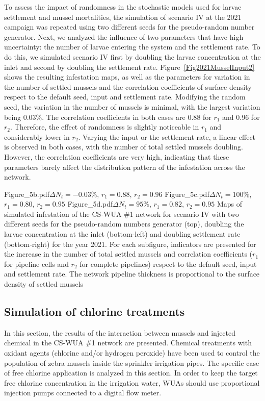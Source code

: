\documentclass[review,authoryear]{elsarticle}
\begin{document}
To assess the impact of randomness in the stochastic models used for larvae
settlement and mussel mortalities, the simulation of scenario IV at the 2021
campaign was repeated using two different seeds for the pseudo-random number
generator. Next, we analyzed the influence of two parameters that have high
uncertainty: the number of larvae entering the system and the settlement rate.
To do this, we simulated scenario IV first by doubling the larvae concentration
at the inlet and second by doubling the settlement rate.
Figure~\ref{Fig2021MusselInput2} shows the resulting infestation maps, as well
as the parameters for variation in the number of settled mussels and the
correlation coefficients of surface density respect to the default seed, input
and settlement rate. Modifying the random seed, the variation in the number of
mussels is minimal, with the largest variation being 0.03\%. The correlation
coefficients in both cases are 0.88 for $r_1$ and 0.96 for $r_2$. Therefore, the
effect of randomness is slightly noticeable in $r_1$ and considerably lower in
$r_2$. Varying the input or the settlement rate, a linear effect is observed in
both cases, with the number of total settled mussels doubling. However, the
correlation coefficients are very high, indicating that these parameters barely
affect the distribution pattern of the infestation across the network.

{Figure_5b.pdf}{$\Delta N_t=-0.03\%$, $r_1=0.88$, $r_2=0.96$}
{Figure_5c.pdf}{$\Delta N_t=100\%$, $r_1=0.80$, $r_2=0.95$}
{Figure_5d.pdf}{$\Delta N_t=95\%$, $r_1=0.82$, $r_2=0.95$}
{Maps of simulated infestation of the CS-WUA \#1 network for scenario IV with
two different seeds for the pseudo-random numbers generator (top), doubling the
larvae concentration at the inlet (bottom-left) and doubling settlement rate
(bottom-right) for the year 2021. For each subfigure, indicators are presented
for the increase in the number of total settled mussels and correlation
coefficients ($r_1$ for pipeline cells and $r_2$ for complete pipelines) respect
to the default seed, input and settlement rate. The network pipeline thickness
is proportional to the surface density of settled
mussels\label{Fig2021MusselInput2}}

\subsection{Simulation of chlorine treatments}

In this section, the results of the interaction between mussels and injected
chemical in the CS-WUA \#1 network are presented. Chemical treatments with
oxidant agents (chlorine and/or hydrogen peroxide) have been used to control the
population of zebra mussels inside the sprinkler irrigation pipes. The specific
case of free chlorine application is analyzed in this section. In order to keep
the target free chlorine concentration in the irrigation water, WUAs should use
proportional injection pumps connected to a digital flow meter.
\end{document}
